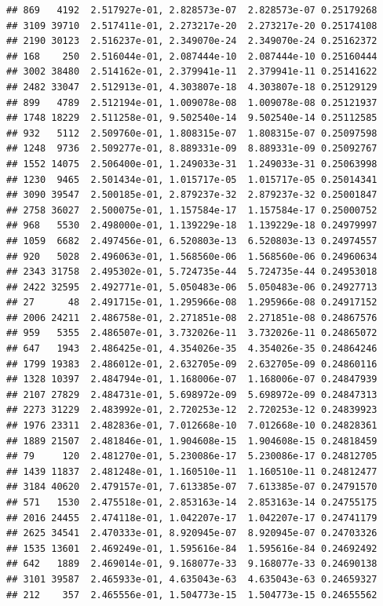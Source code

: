 \documentclass[
]{article}
\begin{document}
\begin{verbatim}
## 869   4192  2.517927e-01, 2.828573e-07  2.828573e-07 0.25179268
## 3109 39710  2.517411e-01, 2.273217e-20  2.273217e-20 0.25174108
## 2190 30123  2.516237e-01, 2.349070e-24  2.349070e-24 0.25162372
## 168    250  2.516044e-01, 2.087444e-10  2.087444e-10 0.25160444
## 3002 38480  2.514162e-01, 2.379941e-11  2.379941e-11 0.25141622
## 2482 33047  2.512913e-01, 4.303807e-18  4.303807e-18 0.25129129
## 899   4789  2.512194e-01, 1.009078e-08  1.009078e-08 0.25121937
## 1748 18229  2.511258e-01, 9.502540e-14  9.502540e-14 0.25112585
## 932   5112  2.509760e-01, 1.808315e-07  1.808315e-07 0.25097598
## 1248  9736  2.509277e-01, 8.889331e-09  8.889331e-09 0.25092767
## 1552 14075  2.506400e-01, 1.249033e-31  1.249033e-31 0.25063998
## 1230  9465  2.501434e-01, 1.015717e-05  1.015717e-05 0.25014341
## 3090 39547  2.500185e-01, 2.879237e-32  2.879237e-32 0.25001847
## 2758 36027  2.500075e-01, 1.157584e-17  1.157584e-17 0.25000752
## 968   5530  2.498000e-01, 1.139229e-18  1.139229e-18 0.24979997
## 1059  6682  2.497456e-01, 6.520803e-13  6.520803e-13 0.24974557
## 920   5028  2.496063e-01, 1.568560e-06  1.568560e-06 0.24960634
## 2343 31758  2.495302e-01, 5.724735e-44  5.724735e-44 0.24953018
## 2422 32595  2.492771e-01, 5.050483e-06  5.050483e-06 0.24927713
## 27      48  2.491715e-01, 1.295966e-08  1.295966e-08 0.24917152
## 2006 24211  2.486758e-01, 2.271851e-08  2.271851e-08 0.24867576
## 959   5355  2.486507e-01, 3.732026e-11  3.732026e-11 0.24865072
## 647   1943  2.486425e-01, 4.354026e-35  4.354026e-35 0.24864246
## 1799 19383  2.486012e-01, 2.632705e-09  2.632705e-09 0.24860116
## 1328 10397  2.484794e-01, 1.168006e-07  1.168006e-07 0.24847939
## 2107 27829  2.484731e-01, 5.698972e-09  5.698972e-09 0.24847313
## 2273 31229  2.483992e-01, 2.720253e-12  2.720253e-12 0.24839923
## 1976 23311  2.482836e-01, 7.012668e-10  7.012668e-10 0.24828361
## 1889 21507  2.481846e-01, 1.904608e-15  1.904608e-15 0.24818459
## 79     120  2.481270e-01, 5.230086e-17  5.230086e-17 0.24812705
## 1439 11837  2.481248e-01, 1.160510e-11  1.160510e-11 0.24812477
## 3184 40620  2.479157e-01, 7.613385e-07  7.613385e-07 0.24791570
## 571   1530  2.475518e-01, 2.853163e-14  2.853163e-14 0.24755175
## 2016 24455  2.474118e-01, 1.042207e-17  1.042207e-17 0.24741179
## 2625 34541  2.470333e-01, 8.920945e-07  8.920945e-07 0.24703326
## 1535 13601  2.469249e-01, 1.595616e-84  1.595616e-84 0.24692492
## 642   1889  2.469014e-01, 9.168077e-33  9.168077e-33 0.24690138
## 3101 39587  2.465933e-01, 4.635043e-63  4.635043e-63 0.24659327
## 212    357  2.465556e-01, 1.504773e-15  1.504773e-15 0.24655562

\end{verbatim}
\end{document}
